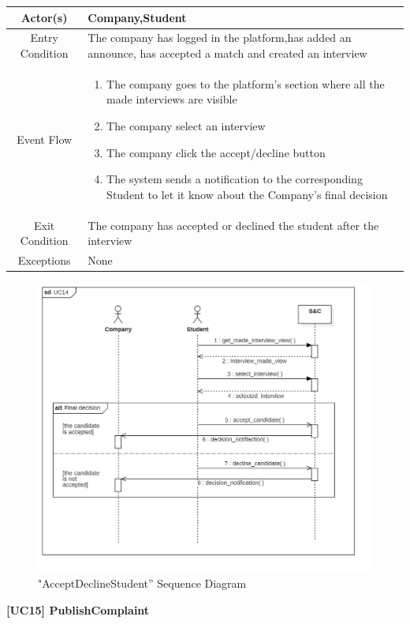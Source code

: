 \documentclass{article}
\begin{document}
\begin{table}[H]
    \centering
    \begin{tabular}{|c|p{10cm}|}
    \hline
        Actor(s)  & Company,Student\\ 
    \hline
        Entry Condition &  
        The company has logged in the platform,has added an announce, has accepted a match and created an interview\\
    \hline
        Event Flow &
        \begin{enumerate}
            \item The company goes to the platform's section where all the made interviews are visible
            \item The company select an interview
            \item The company click the accept/decline button 
            \item The system sends a notification to the corresponding Student to let it know about the Company's final decision
        \end{enumerate}
        \\
    \hline
        Exit Condition & The company has accepted or declined the student after the interview\\
    \hline
        Exceptions &  None\\
    \hline
    \end{tabular}
    \label{tab:my_label}
\end{table}
\begin{figure}[H]
    \centering
    \includegraphics[width=1\linewidth]{sequenceDiagrams/UC14.jpg}
    \caption{"AcceptDeclineStudent” Sequence Diagram}
    \label{fig:enter-label}
\end{figure}
\vspace{1cm}
\textbf{[UC15] PublishComplaint}
\end{document}
